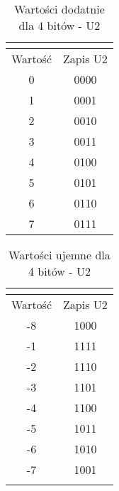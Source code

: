 \documentclass[12pt, a4paper, onside, polish]{article}				%
\begin{document}
\begin{table}[H]
\caption{Wartości dodatnie dla 4 bitów - U2}
\centering
\begin{tabular}{cc}
\multicolumn{1}{l}{} & \multicolumn{1}{l}{} \\ \hline
\multicolumn{1}{|c|}{Wartość} & \multicolumn{1}{c|}{Zapis U2} \\ \hline
\multicolumn{1}{|c|}{0} & \multicolumn{1}{c|}{0000} \\ \hline
\multicolumn{1}{|c|}{1} & \multicolumn{1}{c|}{0001} \\ \hline
\multicolumn{1}{|c|}{2} & \multicolumn{1}{c|}{0010} \\ \hline
\multicolumn{1}{|c|}{3} & \multicolumn{1}{c|}{0011} \\ \hline
\multicolumn{1}{|c|}{4} & \multicolumn{1}{c|}{0100} \\ \hline
\multicolumn{1}{|c|}{5} & \multicolumn{1}{c|}{0101} \\ \hline
\multicolumn{1}{|c|}{6} & \multicolumn{1}{c|}{0110} \\ \hline
\multicolumn{1}{|c|}{7} & \multicolumn{1}{c|}{0111} \\ \hline
\end{tabular}
\end{table}

\begin{table}[H]
\caption{Wartości ujemne dla 4 bitów - U2}
\centering
\begin{tabular}{cc}
\multicolumn{1}{l}{} & \multicolumn{1}{l}{} \\ \hline
\multicolumn{1}{|c|}{Wartość} & \multicolumn{1}{c|}{Zapis U2} \\ \hline
\multicolumn{1}{|c|}{-8} & \multicolumn{1}{c|}{1000} \\ \hline
\multicolumn{1}{|c|}{-1} & \multicolumn{1}{c|}{1111} \\ \hline
\multicolumn{1}{|c|}{-2} & \multicolumn{1}{c|}{1110} \\ \hline
\multicolumn{1}{|c|}{-3} & \multicolumn{1}{c|}{1101} \\ \hline
\multicolumn{1}{|c|}{-4} & \multicolumn{1}{c|}{1100} \\ \hline
\multicolumn{1}{|c|}{-5} & \multicolumn{1}{c|}{1011} \\ \hline
\multicolumn{1}{|c|}{-6} & \multicolumn{1}{c|}{1010} \\ \hline
\multicolumn{1}{|c|}{-7} & \multicolumn{1}{c|}{1001} \\ \hline
\multicolumn{1}{l}{} & \multicolumn{1}{l}{}
\end{tabular}
\end{table}
\end{document}
